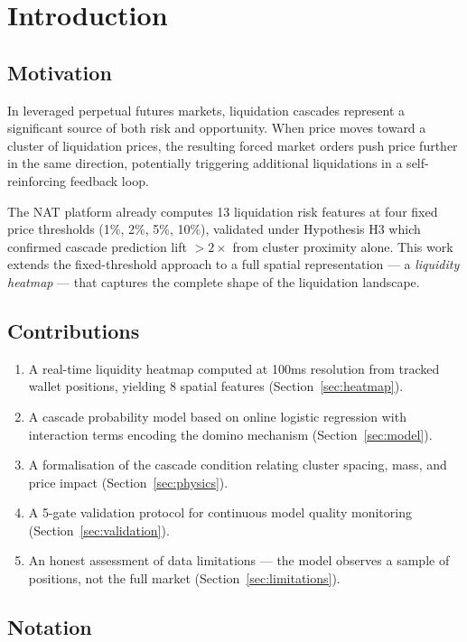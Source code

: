 \documentclass[11pt,a4paper]{article}
\begin{document}
\section{Introduction}

\subsection{Motivation}

In leveraged perpetual futures markets, liquidation cascades represent a significant source of both risk and opportunity. When price moves toward a cluster of liquidation prices, the resulting forced market orders push price further in the same direction, potentially triggering additional liquidations in a self-reinforcing feedback loop.

The NAT platform already computes 13 liquidation risk features at four fixed price thresholds (1\%, 2\%, 5\%, 10\%), validated under Hypothesis H3 which confirmed cascade prediction lift $>2\times$ from cluster proximity alone. This work extends the fixed-threshold approach to a full spatial representation --- a \textit{liquidity heatmap} --- that captures the complete shape of the liquidation landscape.

\subsection{Contributions}

\begin{enumerate}
    \item A real-time liquidity heatmap computed at 100ms resolution from tracked wallet positions, yielding 8 spatial features (Section~\ref{sec:heatmap}).
    \item A cascade probability model based on online logistic regression with interaction terms encoding the domino mechanism (Section~\ref{sec:model}).
    \item A formalisation of the cascade condition relating cluster spacing, mass, and price impact (Section~\ref{sec:physics}).
    \item A 5-gate validation protocol for continuous model quality monitoring (Section~\ref{sec:validation}).
    \item An honest assessment of data limitations --- the model observes a sample of positions, not the full market (Section~\ref{sec:limitations}).
\end{enumerate}

\subsection{Notation}
\end{document}
